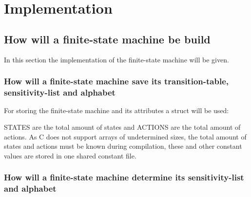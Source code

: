 \hypertarget{implementation}{%
\chapter{Implementation}\label{implementation}}

\hypertarget{how-will-a-finite-state-machine-be-build}{%
\section{How will a finite-state machine be
build}\label{how-will-a-finite-state-machine-be-build}}

In this section the implementation of the finite-state machine will be
given.

\hypertarget{how-will-a-finite-state-machine-save-its-transition-table-sensitivity-list-and-alphabet}{%
\subsection{How will a finite-state machine save its transition-table,
sensitivity-list and
alphabet}\label{how-will-a-finite-state-machine-save-its-transition-table-sensitivity-list-and-alphabet}}

For storing the finite-state machine and its attributes a struct will be
used:

\begin{Shaded}
\begin{Highlighting}[]
 
\NormalTok{\{}

\end{Highlighting}
\end{Shaded}

STATES are the total amount of states and ACTIONS are the total amount
of actions. As C does not support arrays of undetermined sizes, the
total amount of states and actions must be known during compilation,
these and other constant values are stored in one shared constant file.

\hypertarget{how-will-a-finite-state-machine-determine-its-sensitivity-list-and-alphabet}{%
\subsection{How will a finite-state machine determine its
sensitivity-list and
alphabet}\label{how-will-a-finite-state-machine-determine-its-sensitivity-list-and-alphabet}}

